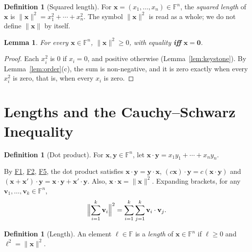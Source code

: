 \documentclass[11pt]{article}
\newcommand{\axF}[1]{\hyperref[ax:F#1]{F#1}}
\theoremstyle{plain}
\newtheorem{lemma}[theorem]{Lemma}
\theoremstyle{definition}
\newtheorem{definition}[theorem]{Definition}
\theoremstyle{remark}
\begin{document}
\begin{definition}[Squared length]\label{def:norm}
For $\mathbf{x} = (x_1, \dots, x_n) \in \mathbb{F}^n$, the \emph{squared length} of $\mathbf{x}$ is $\|\mathbf{x}\|^2 = x_1^2 + \cdots + x_n^2$. The symbol $\|\mathbf{x}\|^2$ is read as a whole; we do not define $\|\mathbf{x}\|$ by itself.
\end{definition}

\begin{lemma}\label{lem:norm}
For every $\mathbf{x} \in \mathbb{F}^n$, $\|\mathbf{x}\|^2 \geq 0$, with equality \textbf{iff} $\mathbf{x} = \mathbf{0}$.
\end{lemma}
\begin{proof}
Each $x_i^2$ is $0$ if $x_i = 0$, and positive otherwise (Lemma~\ref{lem:keystone}). By Lemma~\ref{lem:order}(c), the sum is non-negative, and it is zero exactly when every $x_i^2$ is zero, that is, when every $x_i$ is zero.
\end{proof}

\section{Lengths and the Cauchy--Schwarz Inequality}\label{sec:lengths}

\begin{definition}[Dot product]
For $\mathbf{x}, \mathbf{y} \in \mathbb{F}^n$, let $\mathbf{x} \cdot \mathbf{y} = x_1 y_1 + \cdots + x_n y_n$.
\end{definition}

By \axF{1}, \axF{2}, \axF{5}, the dot product satisfies $\mathbf{x} \cdot \mathbf{y} = \mathbf{y} \cdot \mathbf{x}$, $(c\mathbf{x}) \cdot \mathbf{y} = c(\mathbf{x} \cdot \mathbf{y})$ and $(\mathbf{x} + \mathbf{x}') \cdot \mathbf{y} = \mathbf{x} \cdot \mathbf{y} + \mathbf{x}' \cdot \mathbf{y}$. Also, $\mathbf{x} \cdot \mathbf{x} = \|\mathbf{x}\|^2$. Expanding brackets, for any $\mathbf{v}_1, \dots, \mathbf{v}_k \in \mathbb{F}^n$,
\begin{equation}\label{eq:expand}
    \Bigl\| \sum_{i=1}^{k} \mathbf{v}_i \Bigr\|^2 = \sum_{i=1}^{k} \sum_{j=1}^{k} \mathbf{v}_i \cdot \mathbf{v}_j.
\end{equation}

\begin{definition}[Length]\label{def:length}
An element $\ell \in \mathbb{F}$ is a \emph{length} of $\mathbf{x} \in \mathbb{F}^n$ if $\ell \geq 0$ and $\ell^2 = \|\mathbf{x}\|^2$.
\end{definition}
\end{document}
